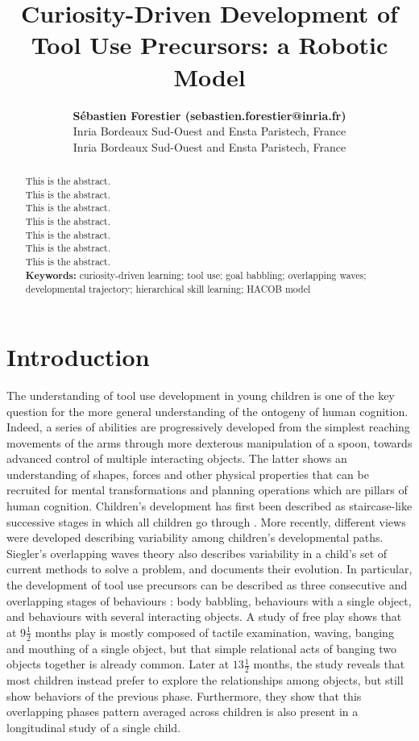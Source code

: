 \documentclass[10pt,letterpaper]{article}
\title{Curiosity-Driven Development of Tool Use Precursors: a Robotic Model}
\author{{\large \bf S\'ebastien Forestier (sebastien.forestier@inria.fr)} \\
	Inria Bordeaux Sud-Ouest and Ensta Paristech, France
  \AND {\large \bf Pierre-Yves Oudeyer (pierre-yves.oudeyer@inria.fr)} \\
	Inria Bordeaux Sud-Ouest and Ensta Paristech, France}
\begin{document}
\maketitle


\begin{abstract}
This is the abstract.\\
This is the abstract.\\
This is the abstract.\\
This is the abstract.\\
This is the abstract.\\
This is the abstract.\\
This is the abstract.\\

\textbf{Keywords:} 
curiosity-driven learning; tool use; goal babbling; overlapping waves; developmental trajectory; hierarchical skill learning; HACOB model
\end{abstract}


\section{Introduction}

	
	The understanding of tool use development in young children is one of the key question for the more general understanding of the ontogeny of human cognition.
	Indeed, a series of abilities are progressively developed from the simplest reaching movements of the arms through more dexterous manipulation of a spoon, towards advanced control of multiple interacting objects.
	The latter shows an understanding of shapes, forces and other physical properties that can be recruited for mental transformations and planning operations which are pillars of human cognition.
	Children's development has first been described as staircase-like successive stages in which all children go through \cite{piaget1952origins}.
	More recently, different views were developed describing variability among children's developmental paths. 
	Siegler's overlapping waves theory \cite{siegler1996emerging} also describes variability in a child's set of current methods to solve a problem, and documents their evolution. 
	In particular, the development of tool use precursors can be described as three consecutive and overlapping stages of behaviours \cite{guerin2013survey}: 
	body babbling, behaviours with a single object, and behaviours with several interacting objects.
	A study of free play \cite{Zelazo198095} shows that at $9\frac{1}{2}$ months play is mostly composed of tactile examination, waving, banging and mouthing of a single object, 
	but that simple relational acts of banging two objects together is already common.
	Later at $13\frac{1}{2}$ months, the study reveals that most children instead prefer to explore the relationships
	among objects, but still show behaviors of the previous phase. 
	Furthermore, they show that this overlapping phases pattern averaged across children is also present in a longitudinal study of a single child.
	
\end{document}

